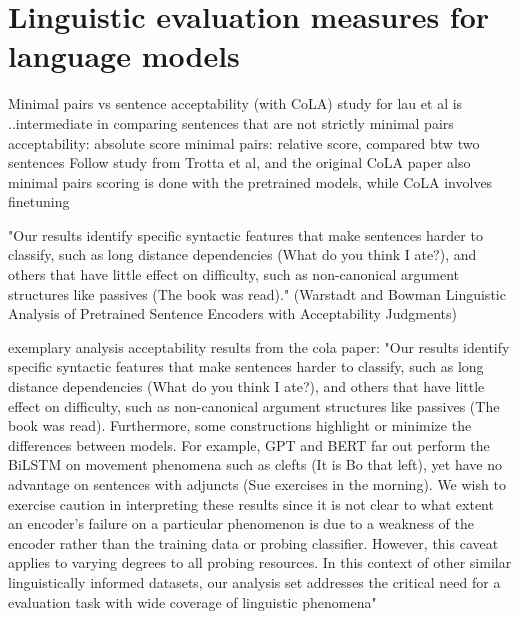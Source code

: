 
\section{Linguistic evaluation measures for language models}



Minimal pairs vs sentence acceptability (with CoLA)
study for lau et al is ..intermediate in comparing sentences that are not strictly minimal pairs
acceptability: absolute score
minimal pairs: relative score, compared btw two sentences
Follow study from Trotta et al, and the original CoLA paper 
also minimal pairs scoring is done with the pretrained models, while CoLA involves finetuning

"Our results identify specific syntactic features that make sentences harder to classify, such as long distance dependencies (What do you think I
ate?), and others that have little effect on difficulty, such as non-canonical argument structures like passives (The book was read)." (Warstadt and Bowman Linguistic Analysis of Pretrained Sentence Encoders with Acceptability Judgments)

exemplary analysis acceptability results from the cola paper:
"Our results identify specific syntactic features
that make sentences harder to classify, such as
long distance dependencies (What do you think I
ate?), and others that have little effect on difficulty, such as non-canonical argument structures
like passives (The book was read). Furthermore,
some constructions highlight or minimize the differences between models. For example, GPT and
BERT far out perform the BiLSTM on movement
phenomena such as clefts (It is Bo that left), yet
have no advantage on sentences with adjuncts (Sue exercises in the morning). We wish to exercise caution in interpreting these results since it is not
clear to what extent an encoder’s failure on a particular phenomenon is due to a weakness of the encoder rather than the training data or probing
classifier. However, this caveat applies to varying
degrees to all probing resources. In this context of
other similar linguistically informed datasets, our analysis set addresses the critical need for a evaluation task with wide coverage of linguistic phenomena"


